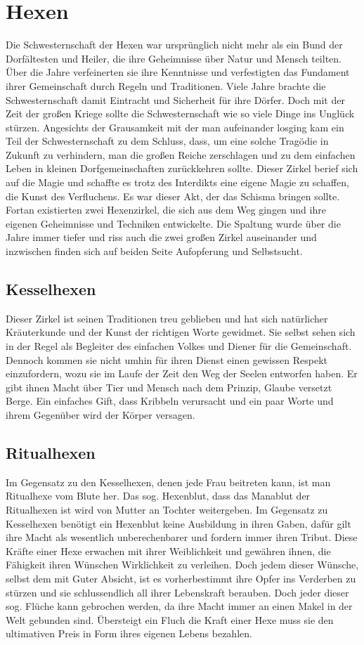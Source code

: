 \documentclass[a4paper,12pt,oneside]{book}
\begin{document}
\chapter{Hexen}
Die Schwesternschaft der Hexen war ursprünglich nicht mehr als ein Bund der Dorfältesten und Heiler, die ihre Geheimnisse über Natur und Mensch teilten. Über die Jahre verfeinerten sie ihre Kenntnisse und verfestigten das Fundament ihrer Gemeinschaft durch Regeln und Traditionen. Viele Jahre brachte die Schwesternschaft damit Eintracht und Sicherheit für ihre Dörfer. Doch mit der Zeit der großen Kriege sollte die Schwesternschaft wie so viele Dinge ins Unglück stürzen. Angesichts der Grausamkeit mit der man aufeinander losging kam ein Teil der Schwesternschaft zu dem Schluss, dass, um eine solche Tragödie in Zukunft zu verhindern, man die großen Reiche zerschlagen und zu dem einfachen Leben in kleinen Dorfgemeinschaften zurückkehren sollte. Dieser Zirkel berief sich auf die Magie und schaffte es trotz des Interdikts eine eigene Magie zu schaffen, die Kunst des Verfluchens. Es war dieser Akt, der das Schisma bringen sollte. Fortan existierten zwei Hexenzirkel, die sich aus dem Weg gingen und ihre eigenen Geheimnisse und Techniken entwickelte. Die Spaltung wurde über die Jahre immer tiefer und riss auch die zwei großen Zirkel auseinander und inzwischen finden sich auf beiden Seite Aufopferung und Selbstsucht.   
\section{Kesselhexen}
Dieser Zirkel ist seinen Traditionen treu geblieben und hat sich natürlicher Kräuterkunde und der Kunst der richtigen Worte gewidmet. Sie selbst sehen sich in der Regel als Begleiter des einfachen Volkes und Diener für die Gemeinschaft. Dennoch kommen sie nicht umhin für ihren Dienst einen gewissen Respekt einzufordern, wozu sie im Laufe der Zeit den Weg der Seelen entworfen haben. Er gibt ihnen Macht über Tier und Mensch nach dem Prinzip, Glaube versetzt Berge. Ein einfaches Gift, dass Kribbeln verursacht und ein paar Worte und ihrem Gegenüber wird der Körper versagen.
\section{Ritualhexen}
Im Gegensatz zu den Kesselhexen, denen jede Frau beitreten kann, ist man Ritualhexe vom Blute her. Das sog. Hexenblut, dass das Manablut der Ritualhexen ist wird von Mutter an Tochter weitergeben. Im Gegensatz zu Kesselhexen benötigt ein Hexenblut keine Ausbildung in ihren Gaben, dafür gilt ihre Macht als wesentlich unberechenbarer und fordern immer ihren Tribut. Diese Kräfte einer Hexe erwachen mit ihrer Weiblichkeit und gewähren ihnen, die Fähigkeit ihren Wünschen Wirklichkeit zu verleihen. Doch jedem dieser Wünsche, selbst dem mit Guter Absicht, ist es vorherbestimmt ihre Opfer ins Verderben zu stürzen und sie schlussendlich all ihrer Lebenskraft berauben. Doch jeder dieser sog. Flüche kann gebrochen werden, da ihre Macht immer an einen Makel in der Welt gebunden sind. Übersteigt ein Fluch die Kraft einer Hexe muss sie den ultimativen Preis in Form ihres eigenen Lebens bezahlen.    
\end{document}
